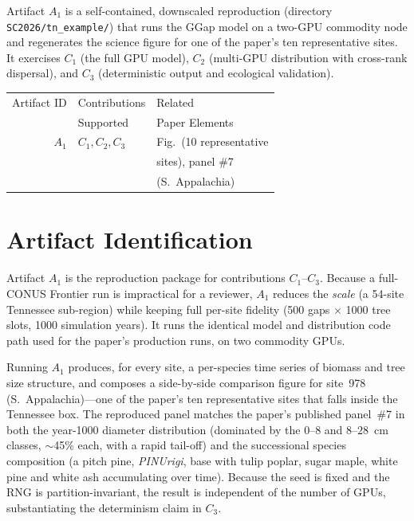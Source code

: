 \documentclass[conference]{IEEEtran}
\begin{document}
Artifact $A_1$ is a self-contained, downscaled reproduction (directory
\texttt{SC2026/tn\_example/}) that runs the GGap model on a two-GPU commodity node and
regenerates the science figure for one of the paper's ten representative sites. It
exercises $C_1$ (the full GPU model), $C_2$ (multi-GPU distribution with cross-rank
dispersal), and $C_3$ (deterministic output and ecological validation).

\begin{center}
\begin{tabular}{rll}
\toprule
Artifact ID  &  Contributions &  Related \\
             &  Supported     &  Paper Elements \\
\midrule
$A_1$   &  $C_1, C_2, C_3$ & Fig.~(10 representative \\
        &                  & sites), panel \#7 \\
        &                  & (S.~Appalachia) \\
\bottomrule
\end{tabular}
\end{center}


\section{Artifact Identification}

\newartifact

\artrel

Artifact $A_1$ is the reproduction package for contributions $C_1$--$C_3$. Because a
full-CONUS Frontier run is impractical for a reviewer, $A_1$ reduces the \emph{scale}
(a 54-site Tennessee sub-region) while keeping full per-site fidelity (500 gaps
$\times$ 1000 tree slots, 1000 simulation years). It runs the identical model and
distribution code path used for the paper's production runs, on two commodity GPUs.

\artexp

Running $A_1$ produces, for every site, a per-species time series of biomass and tree
size structure, and composes a side-by-side comparison figure for site~978
(S.~Appalachia)---one of the paper's ten representative sites that falls inside the
Tennessee box. The reproduced panel matches the paper's published panel~\#7 in both the
year-1000 diameter distribution (dominated by the $0$--$8$ and $8$--$28$~cm classes,
$\sim$45\% each, with a rapid tail-off) and the successional species composition
(a pitch pine, \textit{PINUrigi}, base with tulip poplar, sugar maple, white pine and
white ash accumulating over time). Because the seed is fixed and the RNG is
partition-invariant, the result is independent of the number of GPUs, substantiating
the determinism claim in $C_3$.
\end{document}
